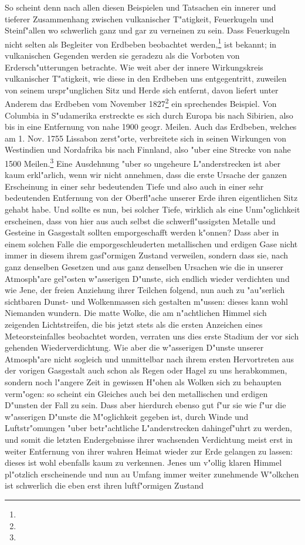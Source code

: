 \documentclass[a4paper, 8pt, oneside, polutonikogreek, german]{article}
\begin{document}
So scheint denn nach allen diesen Beispielen und Tatsachen ein innerer und tieferer Zusammenhang zwischen vulkanischer T"atigkeit, Feuerkugeln und Steinf"allen wo schwerlich ganz und gar zu verneinen zu sein. Dass Feuerkugeln nicht selten als Begleiter von Erdbeben beobachtet werden,\footnote{} ist bekannt; in vulkanischen Gegenden werden sie geradezu als die Vorboten von Erdersch"utterungen betrachte. Wie weit aber der innere Wirkungskreis vulkanischer T"atigkeit, wie diese in den Erdbeben uns entgegentritt, zuweilen von seinem urspr"unglichen Sitz und Herde sich entfernt, davon liefert unter Anderem das Erdbeben vom November 1827\footnote{} ein sprechendes Beispiel. Von Columbia in S"udamerika erstreckte es sich durch Europa bis nach Sibirien, also bis in eine Entfernung von nahe 1900 geogr. Meilen. Auch das Erdbeben, welches am 1. Nov. 1755 Lissabon zerst"orte, verbreitete sich in seinen Wirkungen von Westindien und Nordafrika bis nach Finnland, also "uber eine Strecke von nahe 1500 Meilen.\footnote{} Eine Ausdehnung "uber so ungeheure L"anderstrecken ist aber kaum erkl"arlich, wenn wir nicht annehmen, dass die erste Ursache der ganzen Erscheinung in einer sehr bedeutenden Tiefe und also auch in einer sehr bedeutenden Entfernung von der Oberfl"ache unserer Erde ihren eigentlichen Sitz gehabt habe. Und sollte es nun, bei solcher Tiefe, wirklich als eine Unm"oglichkeit erscheinen, dass von hier aus auch selbst die schwerfl"ussigsten Metalle und Gesteine in Gasgestalt sollten emporgeschafft werden k"onnen? Dass aber in einem solchen Falle die emporgeschleuderten metallischen und erdigen Gase nicht immer in diesem ihrem gasf"ormigen Zustand verweilen, sondern dass sie, nach ganz denselben Gesetzen und aus ganz denselben Ursachen wie die in unserer Atmosph"are gel"osten w"asserigen D"unste, sich endlich wieder verdichten und wie Jene, der freien Anziehung ihrer Teilchen folgend, nun auch zu "au"serlich sichtbaren Dunst- und Wolkenmassen sich gestalten m"ussen: dieses kann wohl Niemanden wundern. Die matte Wolke, die am n"achtlichen Himmel sich zeigenden Lichtstreifen, die bis jetzt stets als die ersten Anzeichen eines Meteorsteinfalles beobachtet worden, verraten uns dies erste Stadium der vor sich gehenden Wiederverdichtung. Wie aber die w"asserigen D"unste unserer Atmosph"are nicht sogleich und unmittelbar nach ihrem ersten Hervortreten aus der vorigen Gasgestalt auch schon als Regen oder Hagel zu uns herabkommen, sondern noch l"angere Zeit in gewissen H"ohen als Wolken sich zu behaupten verm"ogen: so scheint ein Gleiches auch bei den metallischen und erdigen D"unsten der Fall zu sein. Dass aber hierdurch ebenso gut f"ur sie wie f"ur die w"asserigen D"unste die M"oglichkeit gegeben ist, durch Winde und Luftstr"omungen "uber betr"achtliche L"anderstrecken dahingef"uhrt zu werden, und somit die letzten Endergebnisse ihrer wachsenden Verdichtung meist erst in weiter Entfernung von ihrer wahren Heimat wieder zur Erde gelangen zu lassen: dieses ist wohl ebenfalls kaum zu verkennen. Jenes um v"ollig klaren Himmel pl"otzlich erscheinende und nun au Umfang immer weiter zunehmende W"olkchen ist schwerlich die eben erst ihren luftf"ormigen Zustand 
\end{document}
